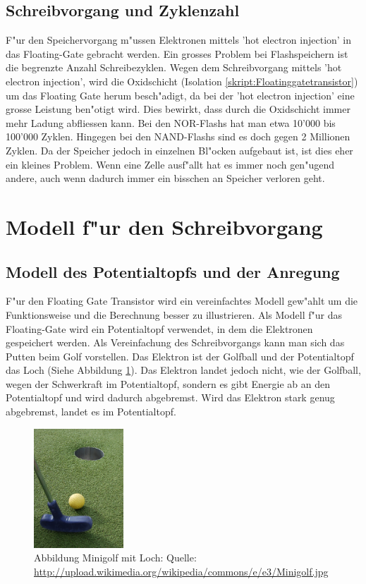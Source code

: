 \begin{refsection}
\subsection{Schreibvorgang und Zyklenzahl}
F"ur den Speichervorgang m"ussen Elektronen mittels 'hot electron injection'
in das Floating-Gate gebracht werden. Ein grosses Problem bei
Flashspeichern ist die begrenzte Anzahl Schreibezyklen.
Wegen dem Schreibvorgang mittels 'hot electron injection', wird die
Oxidschicht (Isolation \ref{skript:Floatinggatetransistor}) um das Floating Gate herum
besch"adigt, da bei der 'hot electron injection' eine grosse Leistung
ben"otigt wird.
Dies bewirkt, dass durch die Oxidschicht immer mehr Ladung abfliessen kann.
Bei den NOR-Flashs hat man etwa 10'000 bis 100'000 Zyklen.
Hingegen bei den NAND-Flashs sind es doch gegen 2 Millionen Zyklen.
Da der Speicher jedoch in einzelnen Bl"ocken aufgebaut ist, ist dies
eher ein kleines Problem.
Wenn eine Zelle ausf"allt hat es immer noch gen"ugend andere, auch wenn
dadurch immer ein bisschen an Speicher verloren geht.

\section{Modell f"ur den Schreibvorgang}
\subsection{Modell des Potentialtopfs und der Anregung}
F"ur den Floating Gate Transistor wird ein vereinfachtes Modell
gew"ahlt um die Funktionsweise und die Berechnung besser zu illustrieren.
Als Modell f"ur das Floating-Gate wird ein Potentialtopf verwendet,
in dem die Elektronen gespeichert werden.
Als Vereinfachung des Schreibvorgangs kann man sich das Putten beim
Golf vorstellen.
Das Elektron ist der Golfball und der Potentialtopf das Loch (Siehe Abbildung \ref{skript:Minigolf}).
Das Elektron landet jedoch nicht, wie der Golfball, wegen der Schwerkraft
im Potentialtopf, sondern es gibt Energie ab an den Potentialtopf und
wird dadurch abgebremst.
Wird das Elektron stark genug abgebremst, landet es im Potentialtopf.

\begin{figure}
\centering
\includegraphics[width=0.3\textwidth]{flash/graphics/Minigolf.jpg}
\caption{Abbildung Minigolf mit Loch: Quelle:
\url{http://upload.wikimedia.org/wikipedia/commons/e/e3/Minigolf.jpg}
\label{skript:Minigolf}}
\end{figure}


\end{refsection}
